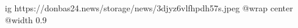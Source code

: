  
 
 
 
 

\ifcmt
  ig https://donbas24.news/storage/news/3djyz6vlfhpdh57s.jpeg
  @wrap center
  @width 0.9
\fi
